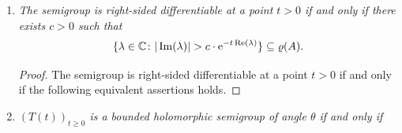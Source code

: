 \begin{example}
\begin{enumerate}[\upshape (i), wide, labelindent=.25em]
\begin{proof}
By hypothesis, the set 
%
\[
	H \coloneq \{m(x) \colon x \in X, \Re(m(x)) \geq b\} 
\]
%
in the case $E = C_{0}(X)$ 
and%
\[
	 H \coloneq \{m(x) \colon \Re(\lambda) \geq b \text{ and for all } \eta > 0,  
\mu(\{x \in X \colon |m(x)-\lambda| < \eta \}) \neq 0\}
\]
%
in the case $E = L^{p}$ is a bounded subset of\/ $\C$.
Thus $\lim_{t \to t'} |\eu^{tz} - \eu^{t'z}| = 0$ uniformly for $z \in H$.
Hence there exists $\delta \in \left]0,1\right]$ such that
\[
[\text{ess}]\text{-}\esssup\left\{\left|\eu^{tm(x)} - \eu^{t'm(x)}\right| \colon x \in X, \Re(m(x)) > b\right\} < \epsilon
\] 
whenever $|t-t'| < \delta$.
Together with the inequality above, we obtain that 
\[
\|T(t) - T(t')\| = [\text{ess}]\text{-}\sup\left\{\left|\eu^{tm(x)} - \eu^{t'm(x)}\right| \colon x \in X\right\} < \epsilon
\]
whenever $|t-t'| < \delta$.
We have shown that the semigroup is norm continuous for $t > 0$ whenever $\{\lambda \in \sigma(A) \colon \Re(\lambda) \geq b\}$ is bounded for all $b \in \R$.
\end{proof}
\item \label{ex:a2-1.28-2}
\textit{The semigroup is right-sided differentiable at a point $t > 0$ 
if and only if there exists $c > 0$ such that}
%
\[
	\{\lambda \in \C \colon |\Im(\lambda)| > c \cdot \eu^{-t\Re(\lambda)}\} \subseteq \rho(A) .
\]
%
\begin{proof}
The semigroup is right-sided differentiable at a point $t > 0$ if and only if the following equivalent assertions holds.
\end{proof}
\item \label{ex:a2-1.28-3}
\textit{$(T(t))_{t \geq 0}$ is a bounded holomorphic semigroup of angle $\theta$ if and only if} 

\end{enumerate}
\end{example}
